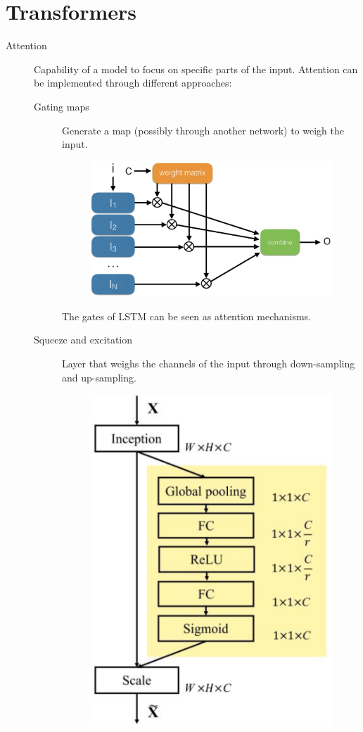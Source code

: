 \section{Transformers}


\begin{description}
    \item[Attention] 
        Capability of a model to focus on specific parts of the input.
        Attention can be implemented through different approaches:
        \begin{description}
            \item[Gating maps] 
                Generate a map (possibly through another network) to weigh the input.

                \begin{figure}[H]
                    \centering
                    \includegraphics[width=0.4\linewidth]{./img/attention_gates.png}
                \end{figure}

                \begin{remark}
                    The gates of LSTM can be seen as attention mechanisms.
                \end{remark}


            \item[Squeeze and excitation] 
                Layer that weighs the channels of the input through down-sampling and up-sampling.

                \begin{figure}[H]
                    \centering
                    \includegraphics[width=0.25\linewidth]{./img/attention_se.png}
                \end{figure}


\end{description}
\end{description}
